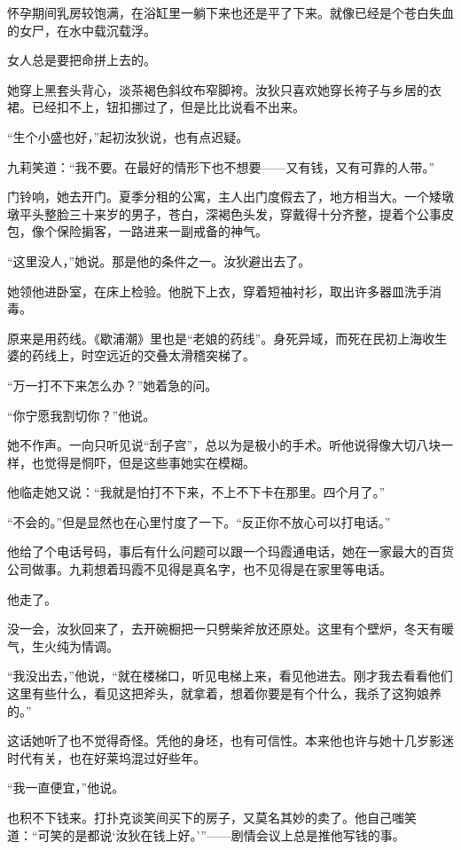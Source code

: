 \par 怀孕期间乳房较饱满，在浴缸里一躺下来也还是平了下来。就像已经是个苍白失血的女尸，在水中载沉载浮。
\par 女人总是要把命拼上去的。
\par 她穿上黑套头背心，淡茶褐色斜纹布窄脚袴。汝狄只喜欢她穿长袴子与乡居的衣裙。已经扣不上，钮扣挪过了，但是比比说看不出来。
\par “生个小盛也好，”起初汝狄说，也有点迟疑。
\par 九莉笑道：“我不要。在最好的情形下也不想要——又有钱，又有可靠的人带。”
\par 门铃响，她去开门。夏季分租的公寓，主人出门度假去了，地方相当大。一个矮墩墩平头整脸三十来岁的男子，苍白，深褐色头发，穿戴得十分齐整，提着个公事皮包，像个保险掮客，一路进来一副戒备的神气。
\par “这里没人，”她说。那是他的条件之一。汝狄避出去了。
\par 她领他进卧室，在床上检验。他脱下上衣，穿着短袖衬衫，取出许多器皿洗手消毒。
\par 原来是用药线。《歇浦潮》里也是“老娘的药线”。身死异域，而死在民初上海收生婆的药线上，时空远近的交叠太滑稽突梯了。
\par “万一打不下来怎么办？”她着急的问。
\par “你宁愿我割切你？”他说。
\par 她不作声。一向只听见说“刮子宫”，总以为是极小的手术。听他说得像大切八块一样，也觉得是恫吓，但是这些事她实在模糊。
\par 他临走她又说：“我就是怕打不下来，不上不下卡在那里。四个月了。”
\par “不会的。”但是显然也在心里忖度了一下。“反正你不放心可以打电话。”
\par 他给了个电话号码，事后有什么问题可以跟一个玛霞通电话，她在一家最大的百货公司做事。九莉想着玛霞不见得是真名字，也不见得是在家里等电话。
\par 他走了。
\par 没一会，汝狄回来了，去开碗橱把一只劈柴斧放还原处。这里有个壁炉，冬天有暖气，生火纯为情调。
\par “我没出去，”他说，“就在楼梯口，听见电梯上来，看见他进去。刚才我去看看他们这里有些什么，看见这把斧头，就拿着，想着你要是有个什么，我杀了这狗娘养的。”
\par 这话她听了也不觉得奇怪。凭他的身坯，也有可信性。本来他也许与她十几岁影迷时代有关，也在好莱坞混过好些年。
\par “我一直便宜，”他说。
\par 也积不下钱来。打扑克谈笑间买下的房子，又莫名其妙的卖了。他自己嗤笑道：“可笑的是都说‘汝狄在钱上好。'”——剧情会议上总是推他写钱的事。

